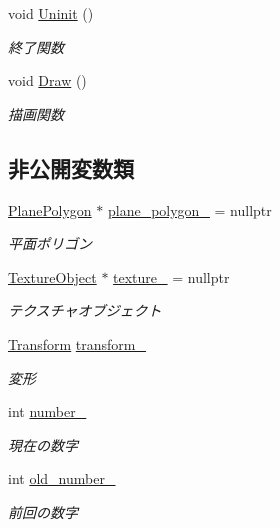 \begin{DoxyCompactItemize}
void \mbox{\hyperlink{class_numbers_polygon_1_1_number_polygon_ab0e804caf3778324516b7a8113cc1d39}{Uninit}} ()
\begin{DoxyCompactList}\small\item\em 終了関数 \end{DoxyCompactList}\item 
void \mbox{\hyperlink{class_numbers_polygon_1_1_number_polygon_a48c8dd4a526a9bb0d657effa3bc471db}{Draw}} ()
\begin{DoxyCompactList}\small\item\em 描画関数 \end{DoxyCompactList}\end{DoxyCompactItemize}
\subsection*{非公開変数類}
\begin{DoxyCompactItemize}
\item 
\mbox{\hyperlink{class_plane_polygon}{Plane\+Polygon}} $\ast$ \mbox{\hyperlink{class_numbers_polygon_1_1_number_polygon_a1347df9d12f3224175801062bfa62e96}{plane\+\_\+polygon\+\_\+}} = nullptr
\begin{DoxyCompactList}\small\item\em 平面ポリゴン \end{DoxyCompactList}\item 
\mbox{\hyperlink{class_texture_object}{Texture\+Object}} $\ast$ \mbox{\hyperlink{class_numbers_polygon_1_1_number_polygon_aa276e12a69aab753c8c35a7f41f5452f}{texture\+\_\+}} = nullptr
\begin{DoxyCompactList}\small\item\em テクスチャオブジェクト \end{DoxyCompactList}\item 
\mbox{\hyperlink{class_transform}{Transform}} \mbox{\hyperlink{class_numbers_polygon_1_1_number_polygon_a199d698d4986e1fb9cfbfbac6a383fc2}{transform\+\_\+}}
\begin{DoxyCompactList}\small\item\em 変形 \end{DoxyCompactList}\item 
int \mbox{\hyperlink{class_numbers_polygon_1_1_number_polygon_a026cdb72be813835b704e2628c287615}{number\+\_\+}}
\begin{DoxyCompactList}\small\item\em 現在の数字 \end{DoxyCompactList}\item 
int \mbox{\hyperlink{class_numbers_polygon_1_1_number_polygon_ab4baecc9e4f7d469a0ec832f44112a17}{old\+\_\+number\+\_\+}}
\begin{DoxyCompactList}\small\item\em 前回の数字 \end{DoxyCompactList}\end{DoxyCompactItemize}


